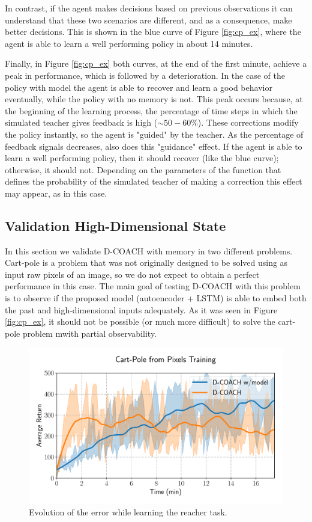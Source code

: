 In contrast, if the agent makes decisions based on previous observations it can understand that these two scenarios are different, and as a consequence, make better decisions. This is shown in the blue curve of Figure \ref{fig:cp_ex}, where the agent is able to learn a well performing policy in about 14 minutes. 

Finally, in  Figure \ref{fig:cp_ex} both curves, at the end of the first minute, achieve a peak in performance, which is followed by a deterioration. In the case of the policy with model the agent is able to recover and learn a good behavior eventually, while the policy with no memory is not. This peak occurs because, at the beginning of the learning process, the percentage of time steps in which the simulated teacher gives feedback is high ($\sim 50-60 \%$). These corrections modify the policy instantly, so the agent is "guided" by the teacher. As the percentage of feedback signals decreases, also does this "guidance" effect. If the agent is able to learn a well performing policy, then it should recover (like the blue curve); otherwise, it should not. Depending on the parameters of the function that defines the probability of the simulated teacher of making a correction this effect may appear, as in this case.

\subsection{Validation High-Dimensional State}
In this section we validate D-COACH with memory in two different problems. Cart-pole is a problem that was not originally designed to be solved using as input raw pixels of an image, so we do not expect to obtain a perfect performance in this case. The main goal of testing D-COACH with this problem is to observe if the proposed model (autoencoder + LSTM) is able to embed both the past and high-dimensional inputs adequately. As it was seen in Figure \ref{fig:cp_ex}, it should not be possible (or much more difficult) to solve the cart-pole problem mwith partial observability.

\begin{figure}[h]
    \centering
    \includegraphics[width=0.9\linewidth]{imagenes/cap3/cartpole_HD_model.pdf}
    \caption{Evolution of the error while learning the reacher task. }
    \label{fig:cp_hd}
\end{figure}

